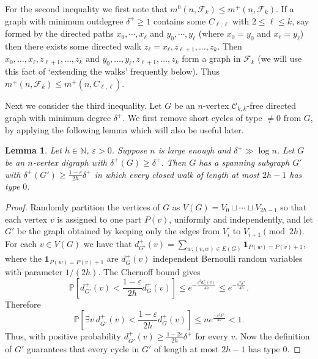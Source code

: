 \documentclass[12pt]{article}
\newtheorem{lemma}{Lemma}
\begin{document}
    For the second inequality we first note that $m^0(n,\mathcal F_k)\le m^+(n,\mathcal F_k)$. If a graph with minimum outdegree $\delta^+\ge 1$ contains some $C_{\ell,\ell}$ with $2\le\ell\le k$, say formed by the directed paths $x_0,\cdots, x_{\ell}$ and $y_0,\cdots, y_\ell$ (where $x_0=y_0$ and $x_\ell=y_\ell$) then there exists some directed walk $z_\ell=x_\ell,z_{\ell+1},\ldots,z_k$. Then $x_0,\ldots,x_{\ell},z_{\ell+1},\ldots,z_{k}$ and $y_0,\ldots,y_\ell,z_{\ell+1},\ldots,z_k$ form a graph in $\mathcal F_k$ (we will use this fact of `extending the walks' frequently below). Thus $m^+(n,\mathcal F_k)\le m^+(n,C_{\ell,\ell})$. 

    Next we consider the third inequality. Let $G$ be an $n$-vertex $\mathcal C_{k,k}$-free directed graph with minimum degree $\delta^+$. We first remove short cycles of type $\ne 0$ from $G$, by applying the following lemma which will also be useful later.
    \begin{lemma} \label{Removing short unbalanced cycles}
        Let $h\in\mathbb N$, $\varepsilon>0$. Suppose $n$ is large enough and $\delta^+\gg\log n$. Let $G$ be an $n$-vertex digraph with $\delta^+(G)\ge\delta^+$. Then $G$ has a spanning subgraph $G'$ with $\delta^+(G')\ge\frac{1-\varepsilon}{2h}\delta^+$ in which every closed walk of length at most $2h-1$ has type $0$.
    \end{lemma}
    \begin{proof}
        Randomly partition the vertices of $G$ as $V(G)=V_0\sqcup\cdots\sqcup V_{2h-1}$ so that each vertex $v$ is assigned to one part $P(v)$, uniformly and independently, and let $G'$ be the graph obtained by keeping only the edges from $V_i$ to $V_{i+1}\pmod{2h}$. For each $v\in V(G)$ we have that $d_{G'}^+(v)=\sum_{w:(v,w)\in E(G)}\textbf{1}_{P(w)=P(v)+1}$, where the $\textbf{1}_{P(w)=P(v)+1}$ are $d_G^+(v)$ independent Bernoulli random variables with parameter $1/(2h).$ The Chernoff bound \cite{chernoff1952measure} gives
    $$\mathbb P\left[d_{G'}^+(v)<\frac{1-\varepsilon}{2h}d_G^+(v)\right]\le e^{-\frac{\varepsilon^2d_G^+(v)}{4h}}\le e^{-\frac{\varepsilon^2\delta^+}{4h}}.$$
    Therefore 
    $$\mathbb P\left[\exists v\ d_{G'}^+(v)<\frac{1-\varepsilon}{2h}d_G^+(v)\right]\le ne^{\frac{-\varepsilon^2\delta^+}{4h}}<1.$$
    Thus, with positive probability $d_{G'}^+(v)\ge\frac{1-2\varepsilon}{2h}\delta^+$ for every $v$. Now the definition of $G'$ guarantees that every cycle in $G'$ of length at most $2h-1$ has type $0$.
    \end{proof}
\end{document}
